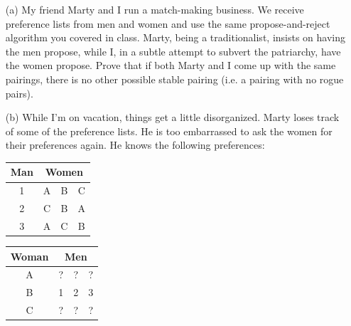 \documentclass[11pt]{article}
\newif\ifsolutions
\renewcommand{\answer}[1]{{\color{mydarkblue}\textbf{Solutions: }#1}}
\begin{document}
\begin{qunlist}
\begin{itemize}
\ifsolutions
\answer{
This proof is incorrect. The use of $\max(x-1, y-1)$ is not correct, 
since $x-1$ and $y-1$ will be negative when $x=0$ or $y=0$.
Then the inductive hypothesis no longer applies, since $x-1$ and $y-1$ 
fall outside the range of natural numbers. We cannot conclude that $x-1 \leq y-1$ and the proof fails.
}
\fi


\end{itemize}


\newpage

\begin{itemize}
\item[(a)] My friend Marty and I run a match-making business. 
We receive preference lists from men and women 
and use the same propose-and-reject algorithm you covered in class. 
Marty, being a traditionalist, insists on having the men propose, 
while I, in a subtle attempt to subvert the patriarchy, have the women propose. 
Prove that if both Marty and I come up with the same pairings, there is no other possible stable pairing 
(i.e. a pairing with no rogue pairs).

\ifsolutions
\answer{
We know that the propose-and-reject algorithm returns the optimal stable pairing 
for the people who propose, and the worst stable pairing possible for those who are proposed to. 
Since Marty and I have the same pairings, the best and worst case must be the same, 
and there can be no other stable pairings.
}
\fi


\item[(b)] While I'm on vacation, things get a little disorganized. 
Marty loses track of some of the preference lists. 
He is too embarrassed to ask the women for their preferences again. He knows the following preferences:

\begin{center}
\begin{tabular}{|c|ccc|}\hline 
Man&\multicolumn{3}{|c|}{Women}\\\hline 
1&A&B&C\\\hline 
2&C&B&A\\\hline 
3&A&C&B\\\hline
\end{tabular} 
\hspace{2cm}
\begin{tabular}{|c|ccc|}\hline 
Woman&\multicolumn{3}{|c|}{Men}\\\hline 
A&?&?&?\\\hline 
B&1&2&3\\\hline 
C&?&?&?\\\hline
\end{tabular}
\end{center}
   

\end{itemize}
\end{qunlist}
\end{document}
